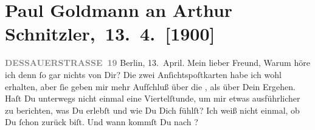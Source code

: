 

         
         \renewcommand{\erwaehntePersonen}{Personen: Paul Goldmann, Eberhard König, Agnes Sorma}
         \renewcommand{\erwaehnteOrte}{Orte: Berlin, Dessauer Straße, Lessing-Theater, Schauspielhaus, Wien}
         \renewcommand{\erwaehnteWerke}{Werke: Gevatter Tod. Ein Märchen von der Menschheit. Drama in fünf Aufzügen, Liebelei. Schauspiel in drei Akten}
               \section[ Paul Goldmann an Arthur Schnitzler, 13. 4. {[}1900{]}]{ Paul Goldmann an Arthur Schnitzler, 13. 4. {[}1900{]}}\nopagebreak{}\rehead{ }\begin{ledgroupsized}[t]{13cm}\normalsize\beginnumbering{} \toendnotes[C]{\smallbreak\pagebreak[2]} 
\toendnotes[C]{\smallbreak}\pstart
           \noindent{}{\pb}\textcolor{gray}{\textbf{DESSAUERSTRASSE 19}}\pend
           \pstart
           \raggedleft{}Berlin, 13. April.\pend
           \pstart{}Mein lieber Freund,\pend\pstart
           Warum höre ich denn ſo gar nichts von Dir? Die zwei Anſichtspoſtkarten habe ich wohl
               erhalten, aber ſie geben mir mehr Aufſchluß über die \label{K_L02910-1v}\label{K_L02910-1h}, als über Dein Ergehen. Haſt Du unterwegs nicht einmal eine Viertelſtunde, um
               mir etwas ausführlicher zu berichten, was Du erlebſt und wie Du Dich fühlſt? Ich weiß
               nicht einmal, ob Du ſchon zurück biſt. Und wann kommſt Du nach \label{K_L02910-2v}\label{K_L02910-2h}?

\end{ledgroupsized}
